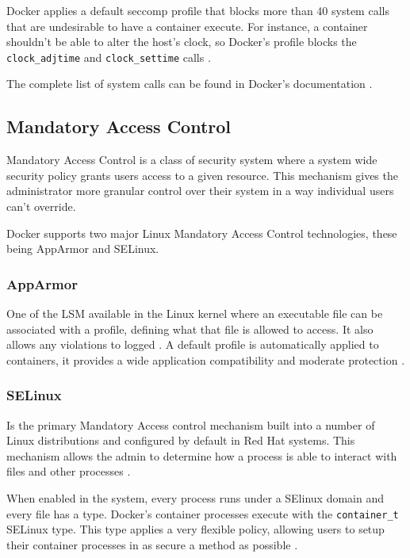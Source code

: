 Docker applies a default seccomp profile that blocks more than 40 system calls that are undesirable to have a container execute. For instance, a container shouldn't be able to alter the host's clock, so Docker's profile blocks the \texttt{clock\_adjtime} and \texttt{clock\_settime} calls \cite{Rice2020-kl}.

The complete list of system calls can be found in Docker's documentation \cite{docker-seccomp}.


\subsection{Mandatory Access Control}
\label{ssec::security:sel-apparm}

Mandatory Access Control is a class of security system where a system wide security policy grants users access to a given resource. This mechanism gives the administrator more granular control over their system in a way individual users can't override\cite{Belim2018}.

Docker supports two major Linux Mandatory Access Control technologies, these being AppArmor and SELinux.

\subsubsection{\textbf{AppArmor}}

One of the \ac{LSM} available in the Linux kernel where an executable file can be associated with a profile, defining what that file is allowed to access. It also allows any violations to logged \cite{ubuntu-apparmor}. A default profile is automatically applied to containers, it provides a wide application compatibility and moderate protection \cite{docker-apparmor}.

\subsubsection{\textbf{SELinux}}

Is the primary Mandatory Access control mechanism built into a number of Linux distributions and configured by default in Red Hat systems. This mechanism allows the admin to determine how a process is able to interact with files and other processes \cite{Rice2020-kl}.

When enabled in the system, every process runs under a SElinux domain and every file has a type. Docker's container processes execute with the \texttt{container\_t} SELinux type. This type applies a very flexible policy, allowing users to setup their container processes in as secure a method as possible \cite{selinux}.
